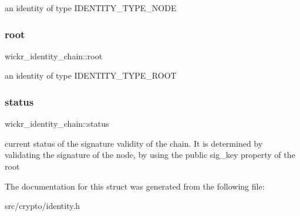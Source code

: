 an identity of type \textquotesingle{}I\+D\+E\+N\+T\+I\+T\+Y\+\_\+\+T\+Y\+P\+E\+\_\+\+N\+O\+DE\textquotesingle{} \mbox{\label{structwickr__identity__chain_a0982b1510591138e2e7d0546741bc6e0}} 
\subsubsection{\texorpdfstring{root}{root}}
{\footnotesize\ttfamily wickr\+\_\+identity\+\_\+chain\+::root}

an identity of type \textquotesingle{}I\+D\+E\+N\+T\+I\+T\+Y\+\_\+\+T\+Y\+P\+E\+\_\+\+R\+O\+OT\textquotesingle{} \mbox{\label{structwickr__identity__chain_acee365b411eb4a7e7c68c115d60e166e}} 
\subsubsection{\texorpdfstring{status}{status}}
{\footnotesize\ttfamily wickr\+\_\+identity\+\_\+chain\+::status}

current status of the signature validity of the chain. It is determined by validating the signature of the node, by using the public \textquotesingle{}sig\+\_\+key\textquotesingle{} property of the root 

The documentation for this struct was generated from the following file\+:\begin{DoxyCompactItemize}
\item 
src/crypto/identity.\+h\end{DoxyCompactItemize}
